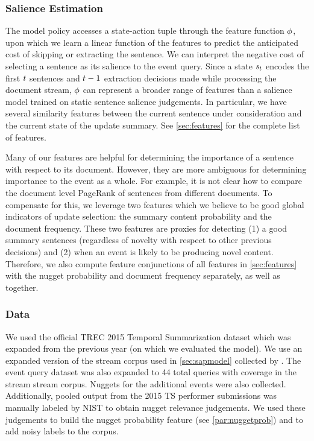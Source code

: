 \subsubsection{Salience Estimation}
The model policy accesses a state-action tuple through the feature function 
$\phi$, upon which we learn a linear function of the features to predict 
the anticipated cost of skipping or extracting the sentence. We can interpret
the negative cost of selecting a sentence as its salience to the event
query. Since a
state $s_t$ encodes the first $t$ sentences and $t-1$
extraction decisions made while processing the document stream, $\phi$
can represent a broader range of features than a salience model trained 
on static sentence salience judgements. In particular, we have several
similarity features between the current sentence under consideration and
the current state of the update summary. See \autoref{sec:features} for the 
complete list of features. 

Many of our features are helpful for
 determining the importance of a sentence with respect to its document.
 However, they are more ambiguous for determining importance to the event as
 a whole. For example, it is not clear how to compare the document level
 PageRank of sentences from different documents. To compensate for this, we
 leverage two features which we believe to be good global indicators of
 update selection: the summary content probability and the document
 frequency.  These two features are proxies for detecting (1) a good summary
 sentences (regardless of novelty with respect to other previous decisions)
 and (2) when an event is likely to be producing novel content. 
 Therefore, we also 
 compute
  feature conjunctions of all features in \autoref{sec:features} with the nugget 
 probability and document 
 frequency separately, as well as together.

\subsubsection{Data}
We used the official TREC 2015 Temporal Summarization dataset which 
was expanded from the previous year (on which we evaluated the \sap{} model).
We use an expanded version of the stream corpus used in \autoref{sec:sapmodel}
collected by \cite{frank2012building}. 
The event query dataset was also expanded to 44 total queries with coverage 
in the stream stream corpus. Nuggets for the additional events were also 
collected. Additionally, pooled output from the 2015 TS performer submissions
was manually labeled by NIST to obtain nugget relevance judgements. We used 
these judgements to build the nugget probability feature 
(see \autoref{par:nuggetprob}) and to add noisy labels to the corpus.
 

